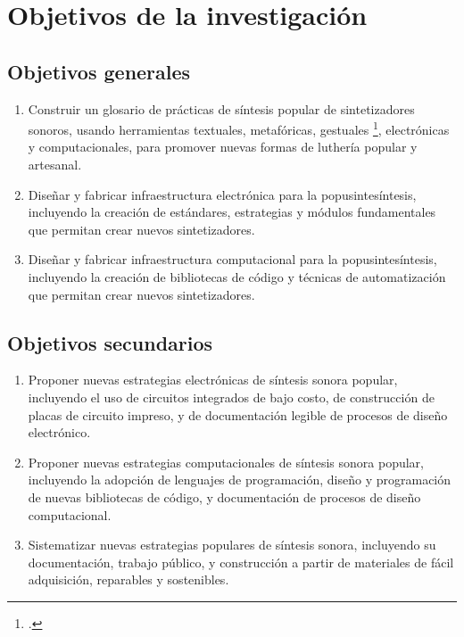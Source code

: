 \documentclass[../proyecto.tex]{subfiles}
\begin{document}
\section{Objetivos de la investigación}


\subsection{Objetivos generales}

\begin{enumerate}
    \item Construir un glosario de prácticas de síntesis popular de sintetizadores sonoros, usando herramientas textuales, metafóricas, gestuales \footcite{haudricourt_cultivo_2019}, electrónicas y computacionales, para promover nuevas formas de luthería popular y artesanal.
    \item Diseñar y fabricar infraestructura electrónica para la popusintesíntesis, incluyendo la creación de estándares, estrategias y módulos fundamentales que permitan crear nuevos sintetizadores.
    \item  Diseñar y fabricar infraestructura computacional para la popusintesíntesis, incluyendo la creación de bibliotecas de código y técnicas de automatización que permitan crear nuevos sintetizadores.
\end{enumerate}

\subsection{Objetivos secundarios}

\begin{enumerate}
    \item Proponer nuevas estrategias electrónicas de síntesis sonora popular, incluyendo el uso de circuitos integrados de bajo costo, de construcción de placas de circuito impreso, y de documentación legible de procesos de diseño electrónico.
    \item Proponer nuevas estrategias computacionales de síntesis sonora popular, incluyendo la adopción de lenguajes de programación, diseño y programación de nuevas bibliotecas de código, y documentación de procesos de diseño computacional.
    \item Sistematizar nuevas estrategias populares de síntesis sonora, incluyendo su documentación, trabajo público, y construcción a partir de materiales de fácil adquisición, reparables y sostenibles.
\end{enumerate}
\end{document}
